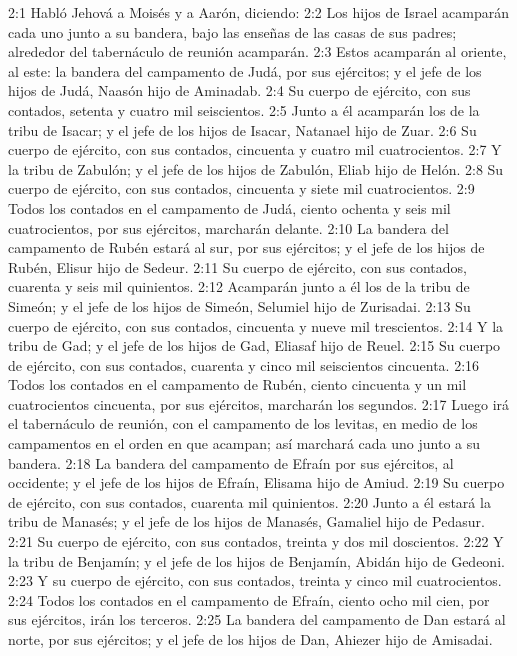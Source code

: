 2:1 Habló Jehová a Moisés y a Aarón, diciendo:  
2:2 Los hijos de Israel acamparán cada uno junto a su bandera, bajo las enseñas de las casas de sus padres; alrededor del tabernáculo de reunión acamparán.  
2:3 Estos acamparán al oriente, al este: la bandera del campamento de Judá, por sus ejércitos; y el jefe de los hijos de Judá, Naasón hijo de Aminadab.  
2:4 Su cuerpo de ejército, con sus contados, setenta y cuatro mil seiscientos.  
2:5 Junto a él acamparán los de la tribu de Isacar; y el jefe de los hijos de Isacar, Natanael hijo de Zuar.  
2:6 Su cuerpo de ejército, con sus contados, cincuenta y cuatro mil cuatrocientos.  
2:7 Y la tribu de Zabulón; y el jefe de los hijos de Zabulón, Eliab hijo de Helón. 
2:8 Su cuerpo de ejército, con sus contados, cincuenta y siete mil cuatrocientos.  
2:9 Todos los contados en el campamento de Judá, ciento ochenta y seis mil cuatrocientos, por sus ejércitos, marcharán delante.  
2:10 La bandera del campamento de Rubén estará al sur, por sus ejércitos; y el jefe de los hijos de Rubén, Elisur hijo de Sedeur.  
2:11 Su cuerpo de ejército, con sus contados, cuarenta y seis mil quinientos.  
2:12 Acamparán junto a él los de la tribu de Simeón; y el jefe de los hijos de Simeón, Selumiel hijo de Zurisadai.  
2:13 Su cuerpo de ejército, con sus contados, cincuenta y nueve mil trescientos.  
2:14 Y la tribu de Gad; y el jefe de los hijos de Gad, Eliasaf hijo de Reuel.  
2:15 Su cuerpo de ejército, con sus contados, cuarenta y cinco mil seiscientos cincuenta.  
2:16 Todos los contados en el campamento de Rubén, ciento cincuenta y un mil cuatrocientos cincuenta, por sus ejércitos, marcharán los segundos.  
2:17 Luego irá el tabernáculo de reunión, con el campamento de los levitas, en medio de los campamentos en el orden en que acampan; así marchará cada uno junto a su bandera.  
2:18 La bandera del campamento de Efraín por sus ejércitos, al occidente; y el jefe de los hijos de Efraín, Elisama hijo de Amiud.  
2:19 Su cuerpo de ejército, con sus contados, cuarenta mil quinientos.  
2:20 Junto a él estará la tribu de Manasés; y el jefe de los hijos de Manasés, Gamaliel hijo de Pedasur.  
2:21 Su cuerpo de ejército, con sus contados, treinta y dos mil doscientos.  
2:22 Y la tribu de Benjamín; y el jefe de los hijos de Benjamín, Abidán hijo de Gedeoni.  
2:23 Y su cuerpo de ejército, con sus contados, treinta y cinco mil cuatrocientos.  
2:24 Todos los contados en el campamento de Efraín, ciento ocho mil cien, por sus ejércitos, irán los terceros.  
2:25 La bandera del campamento de Dan estará al norte, por sus ejércitos; y el jefe de los hijos de Dan, Ahiezer hijo de Amisadai.  
